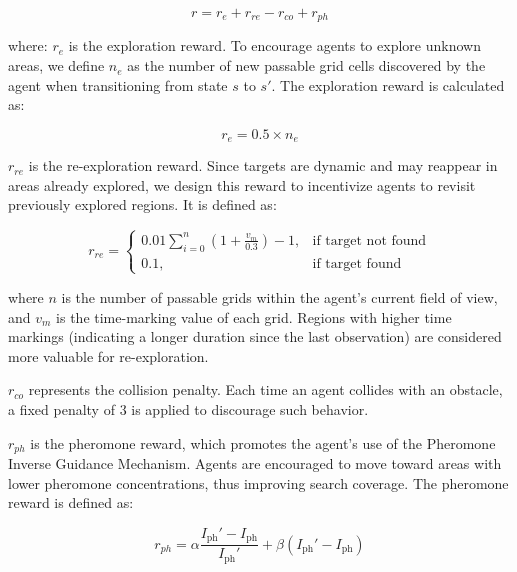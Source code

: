 \documentclass[lettersize,journal]{IEEEtran}
\begin{document}
\begin{equation}
r = r_e + r_{re} - r_{co} + r_{ph} \tag{6}
\end{equation}

where:
 \( r_e \) is the exploration reward. To encourage agents to explore unknown areas, we define \( n_e \) as the number of new passable grid cells discovered by the agent when transitioning from state \( s \) to \( s' \). The exploration reward is calculated as:

\begin{equation}
r_e = 0.5 \times n_e \tag{7}
\end{equation}

 \( r_{re} \) is the re-exploration reward. Since targets are dynamic and may reappear in areas already explored, we design this reward to incentivize agents to revisit previously explored regions. It is defined as:

\begin{equation}
r_{re} = 
\begin{cases} 
0.01 \sum\limits_{i=0}^{n} \left(1 + \frac{v_{m}}{0.3}\right) - 1, & \text{if target not found} \\
0.1, & \text{if target found}
\end{cases} \tag{8}
\end{equation}


where \( n \) is the number of passable grids within the agent's current field of view, and \( v _{m}\) is the time-marking value of each grid. Regions with higher time markings (indicating a longer duration since the last observation) are considered more valuable for re-exploration.

 \( r_{co} \) represents the collision penalty. Each time an agent collides with an obstacle, a fixed penalty of \( 3 \) is applied to discourage such behavior.

 \( r_{ph} \) is the pheromone reward, which promotes the agent’s use of the Pheromone Inverse Guidance Mechanism. Agents are encouraged to move toward areas with lower pheromone concentrations, thus improving search coverage. The pheromone reward is defined as:

\begin{equation}
r_{ph} = \alpha \frac{I_{\text{ph}}' - I_{\text{ph}}}{I_{\text{ph}}'} + \beta (I_{\text{ph}}' - I_{\text{ph}}) \tag{9}
\end{equation}
\end{document}
